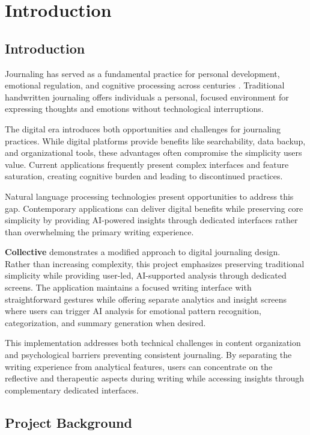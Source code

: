 \chapter{Introduction}\label{ch:intro}


\section{Introduction}\label{sec:introch1}

Journaling has served as a fundamental practice for personal development, emotional regulation, and cognitive processing across centuries \cite{pennebaker1999forming}. Traditional handwritten journaling offers individuals a personal, focused environment for expressing thoughts and emotions without technological interruptions.

The digital era introduces both opportunities and challenges for journaling practices. While digital platforms provide benefits like searchability, data backup, and organizational tools, these advantages often compromise the simplicity users value. Current applications frequently present complex interfaces and feature saturation, creating cognitive burden and leading to discontinued practices.

Natural language processing technologies present opportunities to address this gap. Contemporary applications can deliver digital benefits while preserving core simplicity by providing AI-powered insights through dedicated interfaces rather than overwhelming the primary writing experience.

\textbf{Collective} demonstrates a modified approach to digital journaling design. Rather than increasing complexity, this project emphasizes preserving traditional simplicity while providing user-led, AI-supported analysis through dedicated screens. The application maintains a focused writing interface with straightforward gestures while offering separate analytics and insight screens where users can trigger AI analysis for emotional pattern recognition, categorization, and summary generation when desired.

This implementation addresses both technical challenges in content organization and psychological barriers preventing consistent journaling. By separating the writing experience from analytical features, users can concentrate on the reflective and therapeutic aspects during writing while accessing insights through complementary dedicated interfaces.

\section{Project Background}\label{sec:background}

